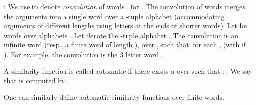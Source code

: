 : We use  to denote {\em
convolution} of words , for . The convolution of 
words merges the arguments into a single word over a -tuple alphabet 
(accommodating arguments of different lengths using  letters at the ends
of shorter words).  Let  be words over alphabets .  Let  denote the
-tuple alphabet .  The convolution  is an 
infinite word (resp., a finite word of length ), 
over , such that: for each ,  (with  if ).  For example,
the convolution  is the 3 letter word .

\begin{definition}
A similarity function  is called
automatic if there exists a \wa  over  such that : . We say that  is computed by .
\end{definition}

One can similarly define automatic similarity functions over finite words. 








 


